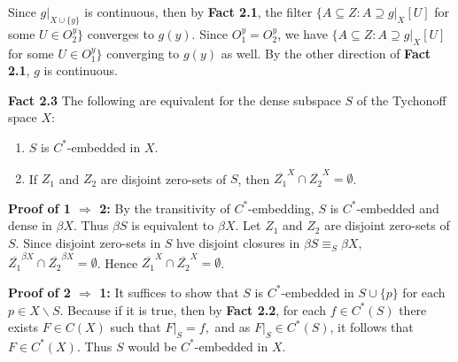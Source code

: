 \documentclass{article}
\begin{document}
\vskip 20pt

Since $g|_{X\cup \{y\}}$ is continuous, then by \textbf{Fact 2.1}, the filter $\{A\subseteq Z: A \supseteq g|_X [U]$ for some $U\in O_2^y\}$ converges
 to $g(y)$. Since $O_1^y=O_2^y$, we have $\{A\subseteq Z: A\supseteq g|_X [U]$ for some $U\in O_1^y\}$ converging to $g(y)$ as well. By the other direction of \textbf{Fact 2.1}, $g$ is continuous.













\vskip 40pt












\textbf{Fact 2.3} The following are equivalent for the dense subspace $S$ of the Tychonoff space $X$: 
\begin{enumerate}
	\item $S$ is $C^*$-embedded in $X$. 
	\item If $Z_1$ and $Z_2$ are disjoint zero-sets of $S$, then $\overline{Z_1}^X\cap \overline{Z_2}^X=\emptyset$.
\end{enumerate}


\vskip 10pt

\textbf{Proof of 1 $\Rightarrow$ 2: }  By the transitivity of $C^*$-embedding, $S$ is $C^*$-embedded and dense in $\beta X$. Thus $\beta S$ is equivalent to $\beta X$. Let $Z_1$ and $Z_2$ are disjoint zero-sets of $S$. Since disjoint zero-sets in $S$ hve disjoint closures in $\beta S \equiv_S \beta X$, $\overline{Z_1}^{\beta X}\cap \overline{Z_2}^{\beta X}=\emptyset$. Hence $\overline{Z_1}^X\cap \overline{Z_2}^X=\emptyset$.


\vskip 20pt



\textbf{Proof of 2 $\Rightarrow$ 1: } It suffices to show that $S$ is $C^*$-embedded in $S\cup \{p\}$ for each $p\in X\backslash S$. Because if it is true, then by \textbf{Fact 2.2}, for each $f\in C^*(S)$ there exists $F\in C(X)$ such that $F|_S=f, $ and as $F|_S\in C^*(S)$, it follows that $F\in C^*(X)$. Thus $S$ would be $C^*$-embedded in $X$.  


\vskip 15pt
\end{document}
